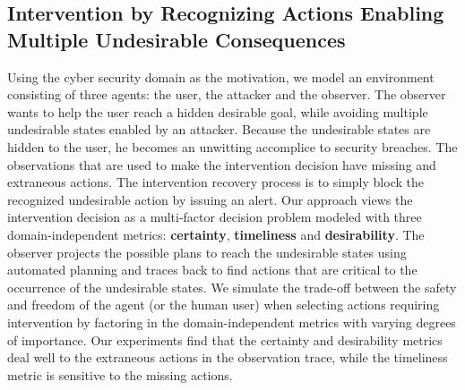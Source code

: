 \subsection{Intervention by Recognizing Actions Enabling Multiple Undesirable Consequences}
Using the cyber security domain as the motivation, we model an environment consisting of three agents: the user, the attacker and the observer.
The observer wants to help the user reach a hidden desirable goal, while avoiding multiple undesirable states enabled by an attacker.
Because the undesirable states are hidden to the user, he becomes an unwitting accomplice to security breaches.
The observations that are used to make the intervention decision have missing and extraneous actions.
The intervention recovery process is to simply block the recognized undesirable action by issuing an alert.
Our approach views the intervention decision as a multi-factor decision problem modeled with three domain-independent metrics: \textbf{certainty}, \textbf{timeliness} and \textbf{desirability}.
The observer projects the possible plans to reach the undesirable states using automated planning and traces back to find actions that are critical to the occurrence of the undesirable states.
We simulate the trade-off between the safety and freedom of the agent (or the human user) when selecting actions requiring intervention by factoring in the domain-independent metrics with varying degrees of importance.
Our experiments find that the certainty and desirability  metrics deal well to the extraneous actions in the observation trace, while the timeliness metric is sensitive to the missing actions.

